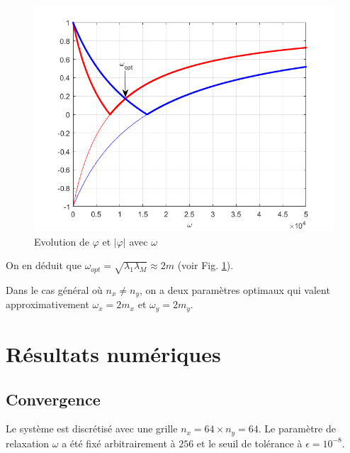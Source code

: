 \documentclass{article}
\begin{document}
\begin{figure}[h!]
 \centering
\includegraphics[scale=0.5]{phi_omega.png}
\caption{Evolution de $\varphi$ et $|\varphi|$ avec $\omega$}
\label{phi_omega}
\end{figure}
\noindent
On en déduit que $\omega_{opt}=\sqrt{\lambda_1 \lambda_M} \approx 2m$ (voir Fig. \ref{phi_omega}).

Dans le cas général où $n_x \neq n_y$, on a deux paramètres optimaux qui valent approximativement
$\omega_x=2m_x$ et $\omega_y=2m_y$.

\newpage

\section{Résultats numériques}

\subsection{Convergence}

Le système est discrétisé avec une grille $n_x=64 \times n_y=64$. Le paramètre de
relaxation $\omega$ a été fixé arbitrairement à $256$ et le seuil de tolérance à $\epsilon=10^{-8}$.
\end{document}
